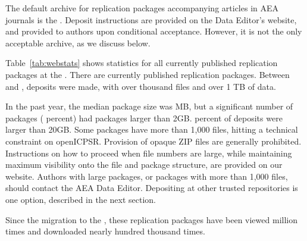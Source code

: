 The default archive for replication packages accompanying articles in AEA journals is the \aeadcr{}. Deposit instructions are provided on the Data Editor's website, and provided to authors upon conditional acceptance. However, it is not the only acceptable archive, as we discuss below.


Table~\ref{tab:webstats} shows statistics for all currently published replication packages at the \aeadcr{}.  There are currently  
\icpsrtotalPublished{} published replication packages.  Between \firstday{} and \pkglastday{}, \pkgcount{} deposits were made, with over \pkgfilesT{} thousand files and over 1 TB of data. 

In the past year, the median package size was  \pkgsizemedian{} MB, but a significant number of packages (\pkgsizetwog{} percent) had  packages larger than 2GB. \pkgsizetwentyg{} percent of deposits were larger than 20GB. 
%
Some packages have more than 1,000 files, hitting a technical constraint on openICPSR. Provision of opaque ZIP files are generally prohibited. Instructions on how to proceed when file numbers are large, while maintaining maximum visibility onto the file and package structure, are provided on our website. Authors with large packages, or packages with more than 1,000 files, should contact the AEA Data Editor. Depositing at other trusted repositories is one option, described in the next section.

Since the migration to the \aeadcr{}, these replication packages have been viewed \icpsrtotalViewsM{} million times and downloaded nearly \icpsrtotalDownloadsHT{} hundred thousand times.




%
%
%



